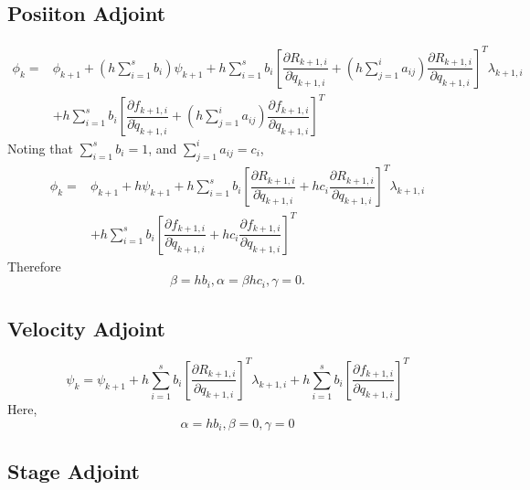 \documentclass[10pt,letter]{book}
\newcommand{\pd}[2]{\dfrac{\partial #1}{\partial #2}}
\begin{document}
     \subsection{Posiiton Adjoint}
     \begin{equation}\nonumber
       \begin{split}
         \phi_k = & \phi_{k+1} + \left(h\sum_{i=1}^s b_i\right) \psi_{k+1}  + h \sum_{i=1}^sb_i \left[\pd{R_{k+1,i}}{\dot{q}_{k+1,i}} + \left( h \sum_{j=1}^i a_{ij} \right) \pd{R_{k+1,i}}{q_{k+1,i}} \right]^T \lambda_{k+1,i}  \\
         & + h \sum_{i=1}^sb_i \left[\pd{f_{k+1,i}}{\dot{q}_{k+1,i}} + \left( h \sum_{j=1}^i a_{ij} \right) \pd{f_{k+1,i}}{q_{k+1,i}} \right]^T
       \end{split}
     \end{equation}
     Noting that $\sum_{i=1}^s b_i = 1$, and $\sum_{j=1}^i a_{ij} = c_i$,
     \begin{equation}\nonumber
       \begin{split}
         \phi_k = & \phi_{k+1} + h \psi_{k+1}  + h \sum_{i=1}^sb_i \left[\pd{R_{k+1,i}}{\dot{q}_{k+1,i}} + hc_i \pd{R_{k+1,i}}{q_{k+1,i}} \right]^T \lambda_{k+1,i}  \\ &+ h \sum_{i=1}^sb_i \left[\pd{f_{k+1,i}}{\dot{q}_{k+1,i}} +hc_i \pd{f_{k+1,i}}{q_{k+1,i}} \right]^T
       \end{split}
     \end{equation}
     Therefore  $$\beta = hb_i, \alpha = \beta hc_i, \gamma = 0.$$

     \subsection{Velocity Adjoint}

     \begin{equation}\nonumber
       \psi_k = \psi_{k+1} + h \sum_{i=1}^s b_i \left[ \pd{R_{k+1,i}}{q_{k+1,i}} \right]^T \lambda_{k+1,i} + h \sum_{i=1}^s b_i \left[ \pd{f_{k+1,i}}{q_{k+1,i}} \right]^T
     \end{equation}
     Here, $$ \alpha = hb_i, \beta = 0, \gamma = 0$$
     
     \subsection{Stage Adjoint}
\end{document}
